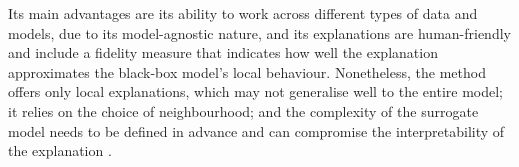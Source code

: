 Its main advantages are its ability to work across different types of data and models, due to its model-agnostic nature, and its explanations are human-friendly and include a fidelity measure that indicates how well the explanation approximates the black-box model's local behaviour. Nonetheless, the method offers only local explanations, which may not generalise well to the entire model; it relies on the choice of neighbourhood; and the complexity of the surrogate model needs to be defined in advance and can compromise the interpretability of the explanation \cite{Molnar2025}.
